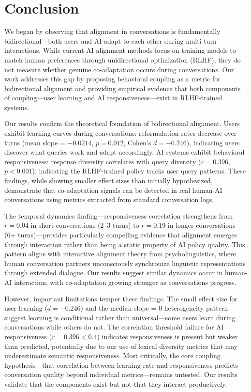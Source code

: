 \section{Conclusion}
\label{sec:conclusion}

We began by observing that alignment in conversations is fundamentally bidirectional---both users and AI adapt to each other during multi-turn interactions. While current AI alignment methods focus on training models to match human preferences through unidirectional optimization (RLHF), they do not measure whether genuine co-adaptation occurs during conversations. Our work addresses this gap by proposing behavioral coupling as a metric for bidirectional alignment and providing empirical evidence that both components of coupling---user learning and AI responsiveness---exist in RLHF-trained systems.

Our results confirm the theoretical foundation of bidirectional alignment. Users exhibit learning curves during conversations: reformulation rates decrease over turns (mean slope = $-0.0214$, $p=0.012$, Cohen's $d=-0.246$), indicating users discover what queries work and adapt accordingly. AI systems exhibit behavioral responsiveness: response diversity correlates with query diversity ($r=0.396$, $p<0.001$), indicating the RLHF-trained policy tracks user query patterns. These findings, while showing smaller effect sizes than initially hypothesized, demonstrate that co-adaptation signals can be detected in real human-AI conversations using metrics extracted from standard conversation logs.

The temporal dynamics finding---responsiveness correlation strengthens from $r=0.04$ in short conversations (2--3 turns) to $r=0.19$ in longer conversations (6+ turns)---provides particularly compelling evidence that alignment emerges through interaction rather than being a static property of AI policy quality. This pattern aligns with interactive alignment theory from psycholinguistics, where human conversation partners unconsciously synchronize linguistic representations through extended dialogue. Our results suggest similar dynamics occur in human-AI interaction, with co-adaptation growing stronger as conversations progress.

However, important limitations temper these findings. The small effect size for user learning ($d=-0.246$) and the median slope = 0 heterogeneity pattern suggest learning is conditional rather than universal---some users learn during conversations while others do not. The correlation threshold failure for AI responsiveness ($r=0.396 < 0.4$) indicates responsiveness is present but weaker than predicted, potentially due to our use of lexical diversity metrics that may underestimate semantic responsiveness. Most critically, the core coupling hypothesis---that correlation between learning rate and responsiveness predicts conversation quality beyond individual metrics---remains untested. Our results validate that the components exist but not that they interact productively.

